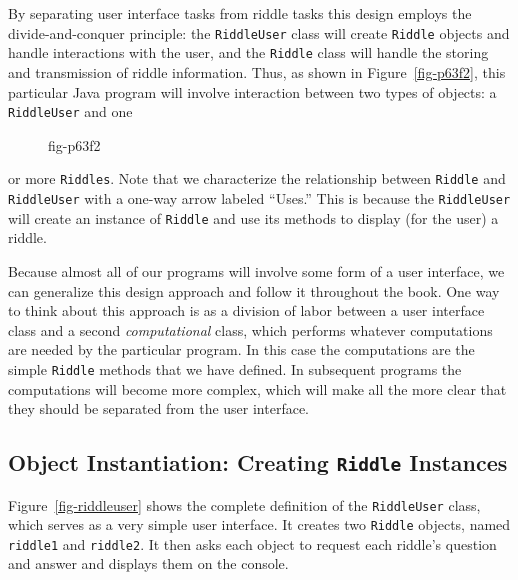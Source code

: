 By separating user interface tasks from riddle tasks this design
employs the divide-and-conquer principle: the {\tt RiddleUser} class
will create {\tt Riddle} objects and handle interactions with the
user, and the {\tt Riddle} class will handle the storing and
transmission of riddle information.  Thus, as shown in
Figure~\ref{fig-p63f2}, this particular Java program will involve
interaction between two types of objects: a {\tt RiddleUser} and one
\begin{figure}[h!]
\figaleft{chptr02/riddleuser.eps}{This UML class diagram represents an {\em association}
between the {\tt RiddleUser} and {\tt Riddle} classes.  The {\tt
Riddle\-User} class will {\em use} one or more objects of the {\tt
Riddle} class.
} {fig-p63f2}

\end{figure}
or more {\tt Riddles}. Note that we characterize the relationship
between {\tt Riddle} and {\tt RiddleUser} with a one-way arrow labeled
``Uses.''  This is because the {\tt RiddleUser} will create an
instance of {\tt Riddle} and use its methods to display (for the user)
a riddle.

Because almost all of our programs will involve some form of a user
interface, we can generalize this design approach and follow it
throughout the book. One way to think about this approach is as a
division of labor between a user interface class and a second {\em
computational} class, which performs whatever computations are needed
by the particular program. In this case the computations are the simple
{\tt Riddle} methods that we have defined. In subsequent programs the
computations will become more complex, which will make all the more
clear that they should be separated from the user interface.
 

\subsection{Object Instantiation: Creating {\tt Riddle} Instances}

\noindent Figure~\ref{fig-riddleuser} shows the complete definition of the
{\tt RiddleUser} class, which serves as a very simple user
interface. It creates two {\tt Riddle} objects, named {\tt riddle1}
and {\tt riddle2}. It then asks each object to request each riddle's
question and answer and displays them on the console.

